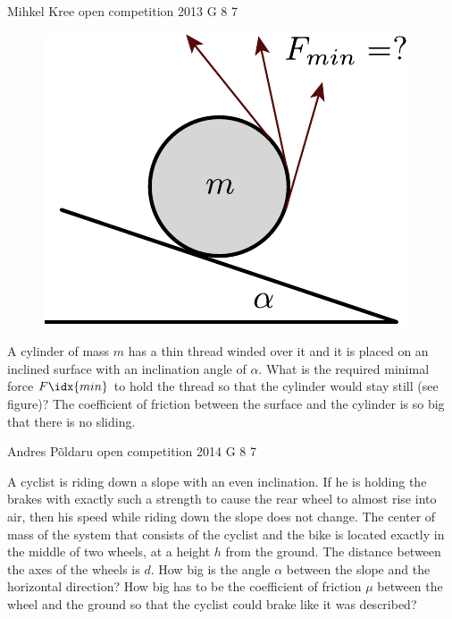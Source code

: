 \documentclass[11pt]{article}
\begin{document}
{Mihkel Kree} %
{open competition} %
{2013} %
{G 8} %
{7} %
{

\ifEngStatement
\begin{figure}
\vspace{-15pt}
\includegraphics[width=\linewidth]{2013-lahg-08-joonis_niidirull-crop}
\end{figure}
A cylinder of mass $m$ has a thin thread winded over it and it is placed on an inclined surface with an inclination angle of $\alpha$. What is the required minimal force $F\idx{min}$ to hold the thread so that the cylinder would stay still (see figure)? The coefficient of friction between the surface and the cylinder is so big that there is no sliding.
\fi
}

{Andres Põldaru} %
{open competition} %
{2014} %
{G 8} %
{7} %
{

\ifEngStatement
A cyclist is riding down a slope with an even inclination. If he is holding the brakes with exactly such a strength to cause the rear wheel to almost rise into air, then his speed while riding down the slope does not change. The center of mass of the system that consists of the cyclist and the bike is located exactly in the middle of two wheels, at a height $h$ from the ground. The distance between the axes of the wheels is $d$. How big is the angle $\alpha$ between the slope and the horizontal direction? How big has to be the coefficient of friction $\mu$ between the wheel and the ground so that the cyclist could brake like it was described?
\fi
}
\end{document}
